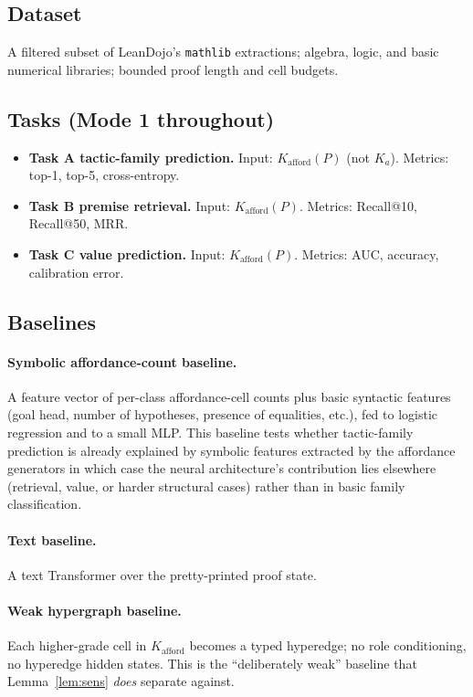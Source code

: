 \documentclass[11pt]{article}
\theoremstyle{definition}
\theoremstyle{plain}
\newcommand{\Kafford}{K_{\mathrm{afford}}}
\begin{document}
\subsection{Dataset}

A filtered subset of LeanDojo's \texttt{mathlib} extractions; algebra, logic, and basic numerical libraries; bounded proof length and cell budgets.

\subsection{Tasks (Mode 1 throughout)}

\begin{itemize}
\item \textbf{Task A tactic-family prediction.} Input: $\Kafford(P)$ (not $K_a$). Metrics: top-1, top-5, cross-entropy.
\item \textbf{Task B premise retrieval.} Input: $\Kafford(P)$. Metrics: Recall@10, Recall@50, MRR.
\item \textbf{Task C value prediction.} Input: $\Kafford(P)$. Metrics: AUC, accuracy, calibration error.
\end{itemize}

\subsection{Baselines}\label{sec:baselines}

\paragraph{Symbolic affordance-count baseline.}
A feature vector of per-class affordance-cell counts plus basic syntactic features (goal head, number of hypotheses, presence of equalities, etc.), fed to logistic regression and to a small MLP. This baseline tests whether tactic-family prediction is already explained by symbolic features extracted by the affordance generators  in which case the neural architecture's contribution lies elsewhere (retrieval, value, or harder structural cases) rather than in basic family classification.

\paragraph{Text baseline.}
A text Transformer over the pretty-printed proof state.

\paragraph{Weak hypergraph baseline.}
Each higher-grade cell in $\Kafford$ becomes a typed hyperedge; no role conditioning, no hyperedge hidden states. This is the ``deliberately weak'' baseline that Lemma~\ref{lem:sens} \emph{does} separate against.
\end{document}
